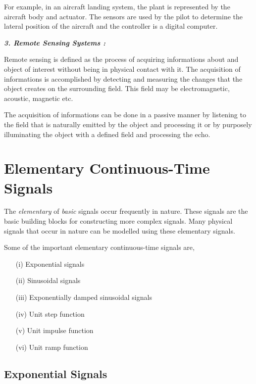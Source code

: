 For example, in an aircraft landing system, the plant is represented by the aircraft body and actuator. The sensors are used by the pilot to determine the lateral position of the aircraft and the controller is a digital computer.

\bigskip
\noindent
{\it\bfseries 3. Remote Sensing Systems :}
\smallskip

Remote sensing is defined as the process of acquiring informations about and object of interest without being in physical contact with it. The acquisition of informations is accomplished by detecting and measuring the changes that the object creates on the surrounding field. This field may be electromagnetic, acoustic, magnetic etc.

The acquisition of informations can be done in a passive manner by listening to the field that is naturally emitted by the object and processing it or by purposely illuminating the object with a defined field and processing the echo.

\section{Elementary Continuous-Time Signals}\label{chap1-sec1.3}

The {\em elementary} of {\em basic} signals occur frequently in nature. These signals are the basic building blocks for constructing more complex signals. Many physical signals that occur in nature can be modelled using these elementary signals.

Some of the important elementary continuous-time signals are,
\begin{itemize}
\item[(i)] Exponential signals

\item[(ii)] Sinusoidal signals

\item[(iii)] Exponentially damped sinusoidal signals

\item[(iv)] Unit step function

\item[(v)] Unit impulse function

\item[(vi)] Unit ramp function
\end{itemize}

\subsection{Exponential Signals}\label{chap1-sec1.3.1}

